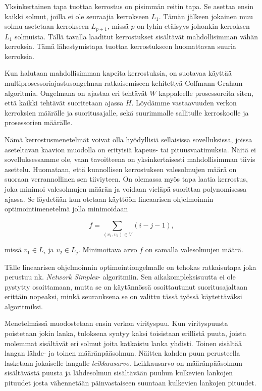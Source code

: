 \documentclass[finnish,12pt]{article}
\begin{document}
Yksinkertainen tapa tuottaa kerrostus on pisimmän reitin tapa. Se asettaa ensin kaikki solmut, joilla ei ole seuraajia kerrokseen $L_1$.
Tämän jälkeen jokainen muu solmu asetetaan kerrokseen $L_{p+1}$, missä $p$ on lyhin etäisyys johonkin kerroksen $L_1$ solmuista.
Tällä tavalla laaditut kerrostukset sisältävät mahdollisimman vähän kerroksia.
Tämä lähestymistapa tuottaa kerrostukseen huomattavan suuria kerroksia.

Kun halutaan mahdollisimman kapeita kerrostuksia, on suotavaa käyttää multiprosessoriajastusongelman ratkaisemiseen kehitettyä Coffmann-Graham -algoritmia. \cite{RefWorks:59}
Ongelmana on ajastaa eri tehtävät $W$ kappaleelle prosessoreita siten, että kaikki tehtävät suoritetaan ajassa $H$.
Löydämme vastaavuuden verkon kerroksien määrälle ja suoritusajalle, sekä suurimmalle sallitulle kerroskoolle ja prosessorien määrälle.

Nämä kerrostusmenetelmät voivat olla hyödyllisiä sellaisissa sovelluksissa, joissa aseteltavan kaavion muodolla on erityisiä kapeus- tai pituusvaatimuksia.
Näitä ei sovelluksessamme ole, vaan tavoitteena on yksinkertaisesti mahdollisimman tiivis asettelu.
Huomataan, että kunnollisen kerrostuksen valesolmujen määrä on suoraan verrannollinen sen tiiviyteen.
On olemassa myös tapa laatia kerrostus, joka minimoi valesolmujen määrän ja voidaan vieläpä suorittaa polynomisessa ajassa.
Se löydetään kun otetaan käyttöön lineaarisen ohjelmoinnin optimointimenetelmä jolla minimoidaan

$$f=\displaystyle\sum\limits_{(v_1,v_2) \in V} (i - j - 1),$$

missä $v_1 \in L_i$ ja $v_2 \in L_j$. Minimoitava arvo $f$ on samalla valesolmujen määrä.

Tälle lineaarisen ohjelmoinnin optimointiongelmalle on tehokas ratkaisutapa joka perustuu nk. \emph{Network Simplex}- algoritmiin\cite{RefWorks:28}. Sen aikakompleksisuutta ei ole pystytty osoittamaan, mutta se on käytännössä osoittautunut suoritusajaltaan erittäin nopeaksi, minkä seurauksena se on valittu tässä työssä käytettäväksi algoritmiksi.

Menetelmässä muodostetaan ensin verkon virityspuu.
Kun virityspuusta poistetaan jokin lanka, tuloksena syntyy kaksi toisistaan erillistä puuta, joista molemmat sisältävät eri solmut joita katkaistu lanka yhdisti.
Toinen sisältää langan lähde- ja toinen määränpääsolmun.
Näitten kahden puun perusteella lasketaan jokaiselle langalle \emph{leikkausarvo}.
Leikkausarvo on määränpääsolmun sisältävästä puusta ja lähdesolmun sisältävään puuhun kulkevien lankojen pituudet
josta vähennetään päinvastaiseen suuntaan kulkevien lankojen pituudet.
\end{document}
